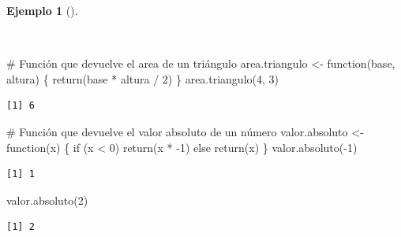 \documentclass[
  a4paper,
]{scrreport}
\newenvironment{Shaded}{\begin{snugshade}}{\end{snugshade}}
\newcommand{\CommentTok}[1]{\textcolor[rgb]{0.37,0.37,0.37}{#1}}
\newcommand{\ControlFlowTok}[1]{\textcolor[rgb]{0.00,0.23,0.31}{#1}}
\newcommand{\DecValTok}[1]{\textcolor[rgb]{0.68,0.00,0.00}{#1}}
\newcommand{\FunctionTok}[1]{\textcolor[rgb]{0.28,0.35,0.67}{#1}}
\newcommand{\NormalTok}[1]{\textcolor[rgb]{0.00,0.23,0.31}{#1}}
\newcommand{\OtherTok}[1]{\textcolor[rgb]{0.00,0.23,0.31}{#1}}
\newcommand{\SpecialCharTok}[1]{\textcolor[rgb]{0.37,0.37,0.37}{#1}}
\theoremstyle{definition}
\theoremstyle{definition}
\newtheorem{example}{Ejemplo}[chapter]
\theoremstyle{remark}
\begin{document}
\begin{example}[]\protect\hypertarget{exm-retorno-funciones}{}\label{exm-retorno-funciones}

~

\begin{Shaded}
\begin{Highlighting}[]
\CommentTok{\# Función que devuelve el area de un triángulo}
\NormalTok{area.triangulo }\OtherTok{\textless{}{-}} \ControlFlowTok{function}\NormalTok{(base, altura) \{}
  \FunctionTok{return}\NormalTok{(base }\SpecialCharTok{*}\NormalTok{ altura }\SpecialCharTok{/} \DecValTok{2}\NormalTok{)}
\NormalTok{\}}
\FunctionTok{area.triangulo}\NormalTok{(}\DecValTok{4}\NormalTok{, }\DecValTok{3}\NormalTok{)}
\end{Highlighting}
\end{Shaded}

\begin{verbatim}
[1] 6
\end{verbatim}

\begin{Shaded}
\begin{Highlighting}[]
\CommentTok{\# Función que devuelve el valor absoluto de un número}
\NormalTok{valor.absoluto }\OtherTok{\textless{}{-}} \ControlFlowTok{function}\NormalTok{(x) \{}
  \ControlFlowTok{if}\NormalTok{ (x }\SpecialCharTok{\textless{}} \DecValTok{0}\NormalTok{)}
    \FunctionTok{return}\NormalTok{(x }\SpecialCharTok{*} \SpecialCharTok{{-}}\DecValTok{1}\NormalTok{)}
  \ControlFlowTok{else}
    \FunctionTok{return}\NormalTok{(x)}
\NormalTok{\}}
\FunctionTok{valor.absoluto}\NormalTok{(}\SpecialCharTok{{-}}\DecValTok{1}\NormalTok{)}
\end{Highlighting}
\end{Shaded}

\begin{verbatim}
[1] 1
\end{verbatim}

\begin{Shaded}
\begin{Highlighting}[]
\FunctionTok{valor.absoluto}\NormalTok{(}\DecValTok{2}\NormalTok{)}
\end{Highlighting}
\end{Shaded}

\begin{verbatim}
[1] 2
\end{verbatim}

\end{example}
\end{document}
